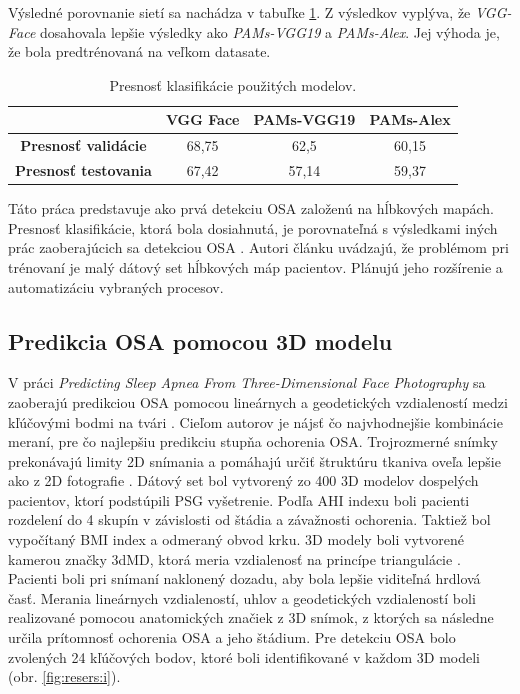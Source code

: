 Výsledné porovnanie sietí sa nachádza v tabuľke \ref{tab:resers:2}. Z výsledkov vyplýva, že \textit{VGG-Face} dosahovala lepšie výsledky ako \textit{PAMs-VGG19} a \textit{PAMs-Alex}. Jej výhoda je, že bola predtrénovaná na veľkom datasate. 

\begin{table}[H]
	\caption{\label{tab:resers:2} Presnosť klasifikácie použitých modelov. }
	\centering
	\begin{tabular}{cccc}
		\toprule
		\textbf{} & \textbf{VGG Face} & \textbf{PAMs-VGG19} & \textbf{PAMs-Alex}     \\ 
		\midrule
		\textbf{Presnosť validácie}		& 68,75		& 62,5		& 60,15		\\ 
		\textbf{Presnosť testovania}	& 67,42		& 57,14  	& 59,37		\\ 
		\bottomrule
	\end{tabular}
\end{table}

Táto práca predstavuje ako prvá detekciu OSA založenú na hĺbkových mapách. Presnosť klasifikácie, ktorá bola dosiahnutá, je porovnateľná s výsledkami iných prác zaoberajúcich sa detekciou OSA \cite{balaei2017automatic}. Autori článku uvádzajú, že problémom pri trénovaní je malý dátový set hĺbkových máp pacientov. Plánujú jeho rozšírenie a automatizáciu vybraných procesov. 

\subsection{Predikcia OSA pomocou 3D modelu}
\label{sec:med:euclid}
V práci \textit{Predicting Sleep Apnea From Three-Dimensional Face Photography} sa zaoberajú predikciou OSA pomocou lineárnych a geodetických vzdialeností medzi kľúčovými bodmi na tvári \cite{eastwood2020predicting}. Cieľom autorov je nájsť čo najvhodnejšie kombinácie meraní, pre čo najlepšiu predikciu stupňa ochorenia OSA. 
Trojrozmerné snímky prekonávajú limity 2D snímania a pomáhajú určiť štruktúru tkaniva oveľa lepšie ako z 2D fotografie \cite{lin2018three}. Dátový set bol vytvorený zo 400 3D modelov dospelých pacientov, ktorí podstúpili PSG vyšetrenie. Podľa AHI indexu boli pacienti rozdelení do 4 skupín v závislosti od štádia a závažnosti ochorenia. Taktiež bol vypočítaný BMI index a odmeraný obvod krku. 3D modely boli vytvorené kamerou značky 3dMD, ktorá meria vzdialenosť na princípe triangulácie \cite{weinberg2005three,weinberg2006anthropometric}. Pacienti boli pri snímaní naklonený dozadu, aby bola lepšie viditeľná hrdlová časť. Merania lineárnych vzdialeností, uhlov a geodetických vzdialeností boli realizované pomocou anatomických značiek z 3D snímok, z ktorých sa následne určila prítomnosť ochorenia OSA a jeho štádium. Pre detekciu OSA bolo zvolených 24 kľúčových bodov, ktoré boli identifikované v každom 3D modeli (obr. \ref{fig:resers:i}). 



